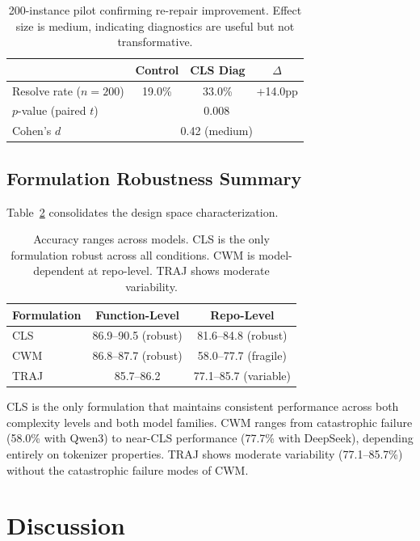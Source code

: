 \documentclass[11pt,a4paper]{article}
\begin{document}
\begin{table}[t]
\centering
\small
\begin{tabular}{lccc}
\toprule
& \textbf{Control} & \textbf{CLS Diag} & \textbf{$\Delta$} \\
\midrule
Resolve rate ($n=200$) & 19.0\% & 33.0\% & +14.0pp \\
$p$-value (paired $t$) & \multicolumn{3}{c}{0.008} \\
Cohen's $d$ & \multicolumn{3}{c}{0.42 (medium)} \\
\bottomrule
\end{tabular}
\caption{200-instance pilot confirming re-repair improvement. Effect size is medium, indicating diagnostics are useful but not transformative.}
\label{tab:pilot}
\end{table}

\subsection{Formulation Robustness Summary}

Table~\ref{tab:robustness} consolidates the design space characterization.

\begin{table}[t]
\centering
\small
\begin{tabular}{lcc}
\toprule
\textbf{Formulation} & \textbf{Function-Level} & \textbf{Repo-Level} \\
\midrule
CLS & 86.9--90.5 (robust) & 81.6--84.8 (robust) \\
CWM & 86.8--87.7 (robust) & 58.0--77.7 (fragile) \\
TRAJ & 85.7--86.2 & 77.1--85.7 (variable) \\
\bottomrule
\end{tabular}
\caption{Accuracy ranges across models. CLS is the only formulation robust across all conditions. CWM is model-dependent at repo-level. TRAJ shows moderate variability.}
\label{tab:robustness}
\end{table}

CLS is the only formulation that maintains consistent performance across both complexity levels and both model families. CWM ranges from catastrophic failure (58.0\% with Qwen3) to near-CLS performance (77.7\% with DeepSeek), depending entirely on tokenizer properties. TRAJ shows moderate variability (77.1--85.7\%) without the catastrophic failure modes of CWM.

\section{Discussion}
\end{document}
